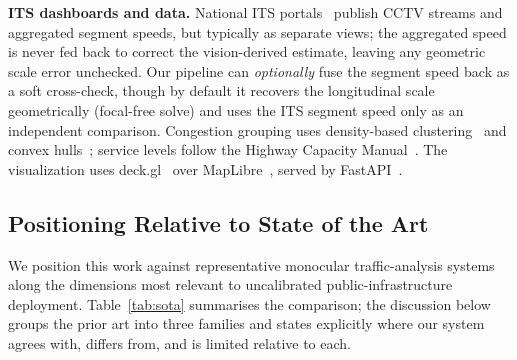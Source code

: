 \documentclass[conference]{IEEEtran}
\renewcommand{\_}{\textunderscore\allowbreak}
\begin{document}
\textbf{ITS dashboards and data.} National ITS portals~\cite{its_openapi} publish
CCTV streams and aggregated segment speeds, but typically as separate views; the
aggregated speed is never fed back to correct the vision-derived estimate, leaving
any geometric scale error unchecked. Our pipeline can \emph{optionally} fuse the segment
speed back as a soft cross-check, though by default it recovers the longitudinal scale
geometrically (focal-free solve) and uses the ITS segment speed only as an independent
comparison.
Congestion grouping uses density-based clustering~\cite{dbscan} and convex
hulls~\cite{andrew1979}; service levels follow the Highway Capacity
Manual~\cite{los_hcm}. The visualization uses deck.gl~\cite{deckgl} over
MapLibre~\cite{maplibre}, served by FastAPI~\cite{fastapi}.


\subsection{Positioning Relative to State of the Art}\label{sec:sota}
We position this work against representative monocular traffic-analysis systems
along the dimensions most relevant to uncalibrated public-infrastructure
deployment. Table~\ref{tab:sota} summarises the comparison; the discussion below
groups the prior art into three families and states explicitly where our system
agrees with, differs from, and is limited relative to each.
\end{document}
